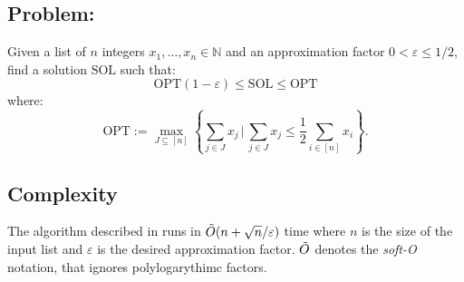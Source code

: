 \subsection{\ApxPartition Problem:}
Given a list of \(n\) integers \(x_1, \ldots, x_n \in \mathbb{N}\) and an approximation factor \(0 < \varepsilon \le 1/2\), find a solution $\text{SOL}$ such that:
\[
    \text{OPT}(1-\varepsilon) \le \text{SOL} \le \text{OPT}
\]
where:
\[
    \text{OPT} := \max_{J \subseteq [n]} \left\{ \sum_{j \in J} x_j \, \bigg| \, \sum_{j \in J} x_j \leq \frac{1}{2} \sum_{i \in [n]} x_i \right\}.
\]



\subsection{Complexity}
The algorithm described in \cite{deng} runs in \(\tilde{O}(n + \sqrt{n}/\varepsilon)\) time where \(n\) is the size of the input list and \(\varepsilon\) is the desired approximation factor. $\tilde{O}$ denotes the \textit{soft-O} notation, that ignores polylogarythimc factors.



